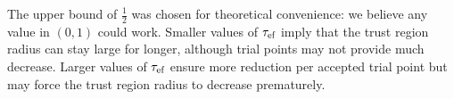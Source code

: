 The upper bound of $\frac 1 2$ was chosen for theoretical convenience: we believe any value in $(0, 1)$ could work.
Smaller values of ${\tau_{\textrm{ef}}}$ imply that the trust region radius can stay large for longer, although trial points may not provide much decrease.
Larger values of ${\tau_{\textrm{ef}}}$ ensure more reduction per accepted trial point but may force the trust region radius to decrease prematurely.




% 


